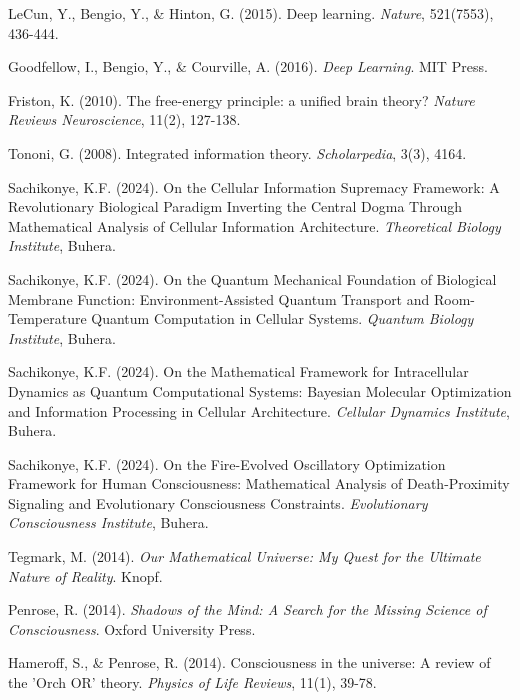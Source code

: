 \documentclass[12pt,a4paper]{article}
\theoremstyle{remark}
\begin{document}

\begin{thebibliography}{99}

LeCun, Y., Bengio, Y., \& Hinton, G. (2015). Deep learning. \textit{Nature}, 521(7553), 436-444.

Goodfellow, I., Bengio, Y., \& Courville, A. (2016). \textit{Deep Learning}. MIT Press.

Friston, K. (2010). The free-energy principle: a unified brain theory? \textit{Nature Reviews Neuroscience}, 11(2), 127-138.

Tononi, G. (2008). Integrated information theory. \textit{Scholarpedia}, 3(3), 4164.

Sachikonye, K.F. (2024). On the Cellular Information Supremacy Framework: A Revolutionary Biological Paradigm Inverting the Central Dogma Through Mathematical Analysis of Cellular Information Architecture. \textit{Theoretical Biology Institute}, Buhera.

Sachikonye, K.F. (2024). On the Quantum Mechanical Foundation of Biological Membrane Function: Environment-Assisted Quantum Transport and Room-Temperature Quantum Computation in Cellular Systems. \textit{Quantum Biology Institute}, Buhera.

Sachikonye, K.F. (2024). On the Mathematical Framework for Intracellular Dynamics as Quantum Computational Systems: Bayesian Molecular Optimization and Information Processing in Cellular Architecture. \textit{Cellular Dynamics Institute}, Buhera.

Sachikonye, K.F. (2024). On the Fire-Evolved Oscillatory Optimization Framework for Human Consciousness: Mathematical Analysis of Death-Proximity Signaling and Evolutionary Consciousness Constraints. \textit{Evolutionary Consciousness Institute}, Buhera.

Tegmark, M. (2014). \textit{Our Mathematical Universe: My Quest for the Ultimate Nature of Reality}. Knopf.

Penrose, R. (2014). \textit{Shadows of the Mind: A Search for the Missing Science of Consciousness}. Oxford University Press.

Hameroff, S., \& Penrose, R. (2014). Consciousness in the universe: A review of the 'Orch OR' theory. \textit{Physics of Life Reviews}, 11(1), 39-78.


\end{thebibliography}
\end{document}
